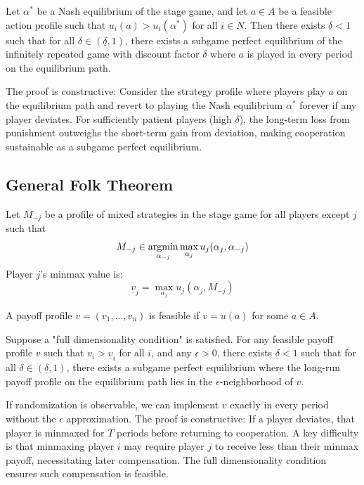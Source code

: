 \documentclass[11pt]{elegantbook_2}
\newcommand{\argmin}{\operatornamewithlimits{argmin}}
\begin{document}
\begin{theorem}
Let $\alpha^*$ be a Nash equilibrium of the stage game, and let $a \in A$ be a feasible action profile such that $u_i(a) > u_i(\alpha^*)$ for all $i \in N$. Then there exists $\underline{\delta} < 1$ such that for all $\delta \in (\underline{\delta},1)$, there exists a subgame perfect equilibrium of the infinitely repeated game with discount factor $\delta$ where $a$ is played in every period on the equilibrium path.
\end{theorem}

The proof is constructive: Consider the strategy profile where players play $a$ on the equilibrium path and revert to playing the Nash equilibrium $\alpha^*$ forever if any player deviates. For sufficiently patient players (high $\delta$), the long-term loss from punishment outweighs the short-term gain from deviation, making cooperation sustainable as a subgame perfect equilibrium.

\subsection{General Folk Theorem}
\begin{definition}
    Let $M_{-j}$ be a profile of mixed strategies in the stage game for all players except $j$ such that
    $$M_{-j} \in \argmin_{\alpha_{-j}} \max_{\alpha_j} u_j(\alpha_j,\alpha_{-j})$$
    Player $j$'s minmax value is:
    $$\underline{v}_j = \max_{\alpha_j} u_j(\alpha_j,M_{-j})$$
\end{definition}

A payoff profile $v=(v_1,\ldots,v_n)$ is feasible if $v=u(a)$ for some $a \in A$.

\begin{theorem}
    Suppose a "full dimensionality condition" is satisfied. For any feasible payoff profile $v$ such that $v_i > \underline{v}_i$ for all $i$, and any $\epsilon > 0$, there exists $\underline{\delta} < 1$ such that for all $\delta \in (\underline{\delta},1)$, there exists a subgame perfect equilibrium where the long-run payoff profile on the equilibrium path lies in the $\epsilon$-neighborhood of $v$.
\end{theorem}

\begin{remark}
    If randomization is observable, we can implement $v$ exactly in every period without the $\epsilon$ approximation. The proof is constructive: If a player deviates, that player is minmaxed for $T$ periods before returning to cooperation. A key difficulty is that minmaxing player $i$ may require player $j$ to receive less than their minmax payoff, necessitating later compensation. The full dimensionality condition ensures such compensation is feasible.
\end{remark}
\end{document}
